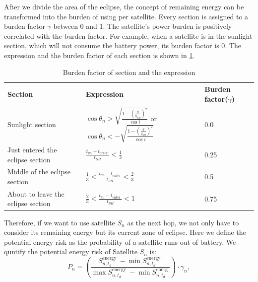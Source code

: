 After we divide the area of the eclipse, the concept of remaining energy can be transformed into the burden of using per satellite.
Every section is assigned to a burden factor $\gamma$ between 0 and 1. The satellite's power burden is positively correlated with the burden factor. For example, when a satellite is in the sunlight section, which will not consume the battery power, its burden factor is 0. The expression and the burden factor of each section is shown in \ref{table:SECTION}.

\begin{table}[h]
	\caption{Burden factor of section and the expression}
	\label{table:SECTION}
\begin{center}
\begin{tabular}{|l|l|l|}
\hline
\textbf{Section} & \textbf{Expression}      &  \textbf{Burden factor($\gamma$)}          \\  \hline
Sunlight section           			  & $ \cos \theta_{n}>\sqrt{\frac{1-\left(\frac{q}{q_{S H}}\right)^{2}}{\cos i}} $ or $ \cos \theta_{n}<-\sqrt{\frac{1-\left(\frac{q}{q_{S H}}\right)^{2}}{\cos i}} $  & 0.0  	\\ \hline
Just entered the eclipse section                   & $ \frac{t_{\theta n}-t_{\text {enter }}}{t_{S H}}<\frac{1}{3} $          													      &0.25	 \\ \hline
Middle of the eclipse section                      & $ \frac{1}{3}<\frac{t_{\theta n}-t_{e n t e r}}{t_{S H}}<\frac{2}{3} $               											      &0.5	\\ \hline
About to leave the eclipse section              & $ \frac{2}{3}<\frac{t_{\theta n}-t_{\text {enter }}}{t_{S H}}<1 $             												      &0.75	 \\ \hline

\end{tabular}
\end{center}
\end{table}

Therefore, if we want to use satellite $S_n$ as the next hop, we not only have to consider its remaining energy but its current zone of eclipse. 
Here we define the potential energy risk as the probability of a satellite runs out of battery. We quntify the potential energy risk of Satellite $S_n$ is:
\begin{equation}
 P_{n}=\left(\frac{S_{n, t_{d}}^{\text {energy }}-\min S_{n, t_{d}}^{\text {energy }}}{\max S_{n, t_{d}}^{\text {energy }}-\min S_{n, t_{d}}^{\text {energ }}}\right) \cdot \gamma_{n},
\label{eq:POTENTIALENERGYRISK}
\end{equation}

